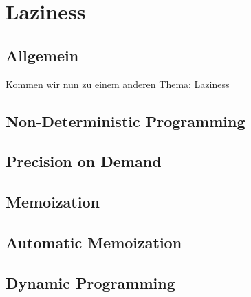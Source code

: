 \documentclass{beamer}
\begin{document}
\section{Laziness}

\subsection{Allgemein}

\begin{frame}
Kommen wir nun zu einem anderen Thema: Laziness\\\pause\bigskip
\end{frame}

\subsection{Non-Deterministic Programming}

\subsection{Precision on Demand}

\subsection{Memoization}

\subsection{Automatic Memoization}

\subsection{Dynamic Programming}
\end{document}
